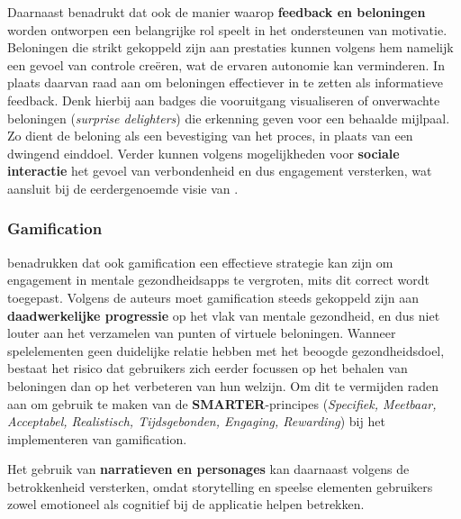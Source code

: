 \vspace{1em}

Daarnaast benadrukt \textcite{Peters2022} dat ook de manier waarop \textbf{feedback en beloningen} worden ontworpen een belangrijke rol speelt in het ondersteunen van motivatie. Beloningen die strikt gekoppeld zijn aan prestaties kunnen volgens hem namelijk een gevoel van controle creëren, wat de ervaren autonomie kan verminderen. In plaats daarvan raad \textcite{Peters2022} aan om beloningen effectiever in te zetten als informatieve feedback. Denk hierbij aan badges die vooruitgang visualiseren of onverwachte beloningen (\textit{surprise delighters}) die erkenning geven voor een behaalde mijlpaal. Zo dient de beloning als een bevestiging van het proces, in plaats van een dwingend einddoel. Verder kunnen volgens \textcite{Peters2022} mogelijkheden voor \textbf{sociale interactie} het gevoel van verbondenheid en dus engagement versterken, wat aansluit bij de eerdergenoemde visie van \textcite{Portz2024}.

\vspace{1em}

\subsubsection{Gamification}
\label{subsubsec:gamification}

\vspace{1em}

\textcite{Auf2021} benadrukken dat ook gamification een effectieve strategie kan zijn om engagement in mentale gezondheidsapps te vergroten, mits dit correct wordt toegepast. Volgens de auteurs moet gamification steeds gekoppeld zijn aan \textbf{daadwerkelijke progressie} op het vlak van mentale gezondheid, en dus niet louter aan het verzamelen van punten of virtuele beloningen. Wanneer spelelementen geen duidelijke relatie hebben met het beoogde gezondheidsdoel, bestaat het risico dat gebruikers zich eerder focussen op het behalen van beloningen dan op het verbeteren van hun welzijn. Om dit te vermijden raden \textcite{Auf2021} aan om gebruik te maken van de \textbf{SMARTER}-principes (\textit{Specifiek, Meetbaar, Acceptabel, Realistisch, Tijdsgebonden, Engaging, Rewarding}) bij het implementeren van gamification.

\vspace{1em}

Het gebruik van \textbf{narratieven en personages} kan daarnaast volgens \textcite{Auf2021} de betrokkenheid versterken, omdat storytelling en speelse elementen gebruikers zowel emotioneel als cognitief bij de applicatie helpen betrekken.

